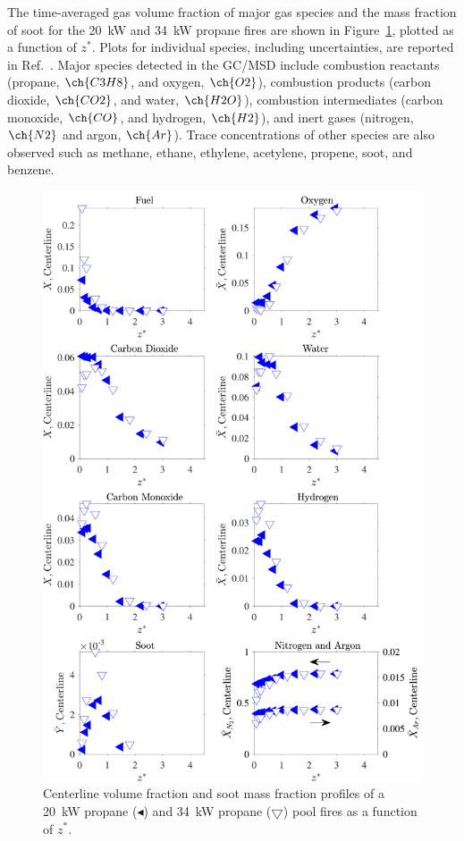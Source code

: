 \documentclass[12pt]{ussci}
\begin{document}
The time-averaged gas volume fraction of major gas species and the mass fraction of soot for the 20~kW and 34~kW propane fires are shown in Figure~\ref{fig:Fuel_Comparison}, plotted as a function of $z^*$. Plots for individual species, including uncertainties, are reported in Ref.~\cite{Falkenstein2021a}. Major species detected in the GC/MSD include combustion reactants (propane, $\ch{C3H8}$, and oxygen, $\ch{O2}$), combustion products (carbon dioxide, $\ch{CO2}$, and water, $\ch{H2O}$), combustion intermediates (carbon monoxide, $\ch{CO}$, and hydrogen, $\ch{H2}$), and inert gases (nitrogen, $\ch{N2}$ and argon, $\ch{Ar}$). Trace concentrations of other species are also observed such as methane, ethane, ethylene, acetylene, propene, soot, and benzene. 
\begin{figure}[!]
	\centering
\includegraphics[width=12.5cm,keepaspectratio]{OVERALL_Fuel_Comparison.pdf}
	\caption[Centerline volume fraction and soot mass fraction profiles]{Centerline volume fraction and soot mass fraction profiles of a 20~kW propane ($\blacktriangleleft$) and 34~kW propane ($\bigtriangledown$) pool fires as a function of $z^*$.}
	\label{fig:Fuel_Comparison}
\end{figure}
\end{document}
